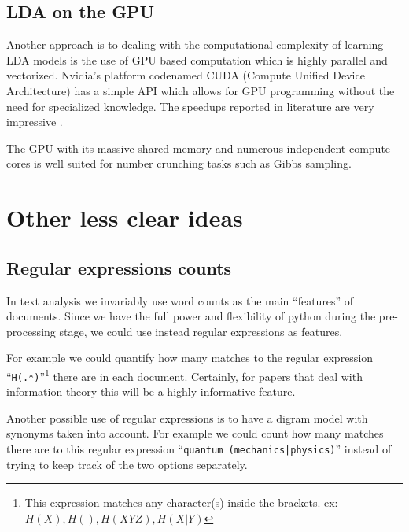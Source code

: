 \documentclass[letterpaper,11pt]{article}
\begin{document}
	\subsection{LDA on the GPU}
		
	        Another approach is to dealing with the computational complexity of learning LDA models
	        is the use of GPU based computation which is highly parallel and vectorized.
	        Nvidia's platform codenamed CUDA (Compute Unified Device Architecture) has 
	        a simple API which allows for GPU programming
	        without the need for specialized knowledge.
	        The speedups reported in literature are very impressive
	        \cite{masada2009accelerating, yan-parallel}.
	        
	        The GPU with its massive shared memory and numerous independent compute cores
	        is well suited for number crunching tasks such as Gibbs sampling.
	        


\section{Other less clear ideas}


	\subsection{Regular expressions counts}
        
        In text analysis we invariably use word counts as the main ``features'' of documents.
        Since we have the full power and flexibility of python during the pre-processing stage,
        we could use instead regular expressions as features.

        For example we could quantify how many matches to the regular  expression ``\texttt{H(.*)}''\footnote{This expression matches any 
        character(s) inside the brackets. ex: $H(X), H(), H(XYZ), H(X|Y)$}
        there are in each document. Certainly, for papers that deal with information theory this will be 
        a highly informative feature.

        Another possible use of regular expressions is to have a digram model with synonyms
        taken into account. For example we could count how many matches there are to this
        regular expression ``\texttt{quantum (mechanics|physics)}'' instead of trying to keep
        track of the two options separately.
		
\end{document}

